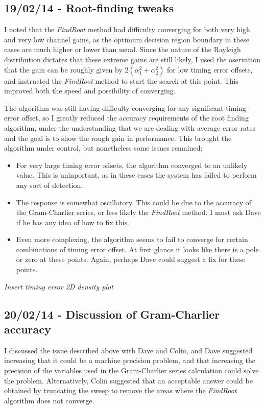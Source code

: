 \subsection{19/02/14 - Root-finding tweaks}

I noted that the \emph{FindRoot} method had difficulty converging for
both very high and very low channel gains, as the optimum decision
region boundary in these cases are much higher or lower than usual.
Since the nature of the Rayleigh distribution dictates that these
extreme gains are still likely, I used the oservation that the gain can
be roughly given by $2(\alpha_1^2 + \alpha_2^2)$ for low timing error
offsets, and instructed the \emph{FindRoot} method to start the search
at this point. This improved both the speed and possibility of
converging.

The algorithm was still having difficulty converging for any significant
timing error offset, so I greatly reduced the accuracy requirements of
the root finding algorithm, under the understanding that we are dealing
with average error rates and the goal is to show the rough gain in
performance. This brought the algorithm under control, but nonetheless
some issues remained:

\begin{itemize}
\itemsep1pt\parskip0pt
\item
  For very large timing error offsets, the algorithm converged to an
  unlikely value. This is uninportant, as in these cases the system has
  failed to perform any sort of detection.
\item
  The response is somewhat oscillatory. This could be due to the
  accuracy of the Gram-Charlier series, or less likely the
  \emph{FindRoot} method. I must ask Dave if he has any idea of how to
  fix this.
\item
  Even more complexing, the algorithm seems to fail to converge for
  certain combinations of timing error offset. At first glance it looks
  like there is a pole or zero at these points. Again, perhaps Dave
  could suggest a fix for these points.
\end{itemize}

\emph{Insert timing error 2D density plot}

\subsection{20/02/14 - Discussion of Gram-Charlier accuracy}

I discussed the issue described above with Dave and Colin, and Dave
suggested increasing that it could be a machine precision problem, and
that increasing the precision of the variables used in the Gram-Charlier
series calculation could solve the problem. Alternatively, Colin
suggested that an acceptable answer could be obtained by truncating the
sweep to remove the areas where the \emph{FindRoot} algorithm does not
converge.

